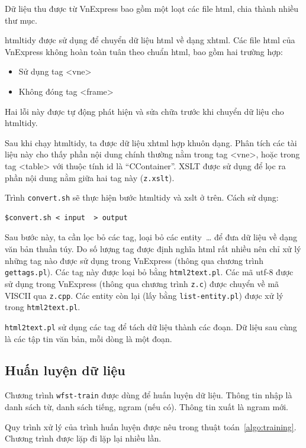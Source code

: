\documentclass[a4paper,oneside,14pt]{extbook} %
\begin{document}
Dữ liệu thu được từ VnExpress bao gồm một loạt các file html, chia
thành nhiều thư mục.

htmltidy được sử dụng để chuyển dữ liệu html về dạng xhtml. Các file
html của VnExpress không hoàn toàn tuân theo chuẩn html, bao gồm hai
trường hợp:

\begin{itemize}
\item Sử dụng tag <vne>
\item Không đóng tag <frame>
\end{itemize}

Hai lỗi này được tự động phát hiện và sửa chữa trước khi chuyển dữ
liệu cho htmltidy.

Sau khi chạy htmltidy, ta được dữ liệu xhtml hợp khuôn dạng. Phân tích
các tài liệu này cho thấy phần nội dung chính thường nằm trong tag
<vne>, hoặc trong tag <table> với thuộc tính id là
``CContainer''. XSLT được sử dụng để lọc ra phần nội dung nằm giữa hai
tag này (\verb#z.xslt#).

Trình \verb#convert.sh# sẽ thực hiện bước htmltidy và xslt ở trên. Cách sử
dụng:
\begin{verbatim}
$convert.sh < input  > output
\end{verbatim}

Sau bước này, ta cần lọc bỏ các tag, loại bỏ các entity~\ldots{}{} để
đưa dữ liệu về dạng văn bản thuần túy. Do số lượng tag được định nghĩa
html rất nhiều nên chỉ xử lý những tag nào được sử dụng trong
VnExpress (thông qua chương trình \verb#gettags.pl#). Các tag này được loại
bỏ bằng \verb#html2text.pl#. Các mã utf-8 được sử dụng trong
VnExpress (thông qua chương trình \verb#z.c#) được chuyển về mã VISCII
qua \verb#z.cpp#. Các entity còn lại (lấy bằng \verb#list-entity.pl#)
được xử lý trong \verb#html2text.pl#.

\verb#html2text.pl# sử dụng các tag để tách dữ liệu thành các đoạn. Dữ
liệu sau cùng là các tập tin văn bản, mỗi dòng là một đoạn.

\subsection{Huấn luyện dữ liệu}
\label{sub:training-data}

Chương trình \verb#wfst-train# được dùng để huấn luyện dữ liệu. Thông
tin nhập là danh sách từ, danh sách tiếng, ngram (nếu có). Thông tin
xuất là ngram mới.

Quy trình xử lý của trình huấn luyện được nêu trong thuật
toán~\ref{algo:training}. Chương trình được lặp đi lặp lại nhiều lần. 
\end{document}
